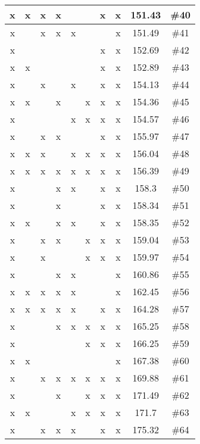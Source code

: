 \begin{center}
\begin{longtable}{|c|c|c|c|c|c|c|c|c|c|}
 x &  x &  x &  x &  &  &  x &  x & 151.43 & \#40 \\ \hline
 x &  &  x &  x &  x &  &  &  x & 151.49 & \#41 \\ \hline
 x &  &  &  &  &  &  x &  x & 152.69 & \#42 \\ \hline
 x &  x &  &  &  &  &  x &  x & 152.89 & \#43 \\ \hline
 x &  &  x &  &  x &  &  x &  x & 154.13 & \#44 \\ \hline
 x &  x &  &  x &  &  x &  x &  x & 154.36 & \#45 \\ \hline
 x &  &  &  &  x &  x &  x &  x & 154.57 & \#46 \\ \hline
 x &  &  x &  x &  &  &  x &  x & 155.97 & \#47 \\ \hline
 x &  x &  x &  &  x &  x &  x &  x & 156.04 & \#48 \\ \hline
 x &  x &  x &  x &  x &  x &  x &  x & 156.39 & \#49 \\ \hline
 x &  &  &  x &  x &  &  x &  x & 158.3 & \#50 \\ \hline
 x &  &  &  x &  &  &  x &  x & 158.34 & \#51 \\ \hline
 x &  x &  &  x &  x &  &  x &  x & 158.35 & \#52 \\ \hline
 x &  &  x &  x &  &  x &  x &  x & 159.04 & \#53 \\ \hline
 x &  &  x &  &  &  x &  x &  x & 159.97 & \#54 \\ \hline
 x &  &  &  x &  x &  &  &  x & 160.86 & \#55 \\ \hline
 x &  x &  x &  x &  x &  &  &  x & 162.45 & \#56 \\ \hline
 x &  x &  x &  x &  x &  &  x &  x & 164.28 & \#57 \\ \hline
 x &  &  &  x &  x &  x &  x &  x & 165.25 & \#58 \\ \hline
 x &  &  &  &  &  x &  x &  x & 166.25 & \#59 \\ \hline
 x &  x &  &  &  &  &  &  x & 167.38 & \#60 \\ \hline
 x &  &  x &  x &  x &  x &  x &  x & 169.88 & \#61 \\ \hline
 x &  &  &  x &  &  x &  x &  x & 171.49 & \#62 \\ \hline
 x &  x &  &  &  x &  x &  x &  x & 171.7 & \#63 \\ \hline
 x &  &  x &  x &  x &  &  x &  x & 175.32 & \#64 \\ \hline
\end{longtable}
\label{table:windProdInputParams}
\end{center}
\normalsize

